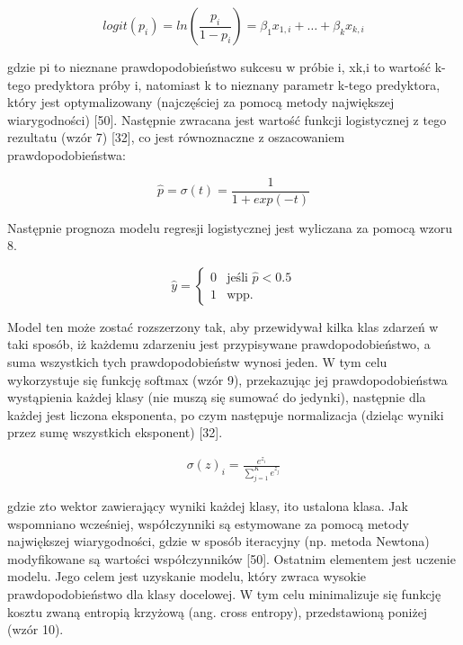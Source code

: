 \begin{equation}
logit(p_{i}) = ln( \frac {p_{i}} {1-p_{i}}) = \beta_{1}x_{1, i}+\dots+\beta_{k}x_{k, i}
\end{equation}

\noindent gdzie pi to nieznane prawdopodobieństwo sukcesu w próbie i, xk,i to wartość k-tego predyktora próby i, natomiast k to nieznany parametr k-tego predyktora, który jest optymalizowany (najczęściej za pomocą metody największej wiarygodności) [50]. Następnie zwracana jest wartość funkcji logistycznej z tego rezultatu (wzór 7) [32], co jest równoznaczne z oszacowaniem prawdopodobieństwa: 

\begin{equation}
\hat p = \sigma(t)=\frac {1} {1+exp(-t)}
\end{equation}

\noindent Następnie prognoza modelu regresji logistycznej jest wyliczana za pomocą wzoru 8.

\begin{equation}
\hat {y} =
    \begin{cases}
      0 & \text{jeśli $\hat {p} < 0.5$}\\
      1 & \text{wpp.}
 \end{cases}       
\end{equation}

\noindent Model ten może zostać rozszerzony tak, aby przewidywał kilka klas zdarzeń w taki sposób, iż każdemu zdarzeniu jest przypisywane prawdopodobieństwo, a suma wszystkich tych prawdopodobieństw wynosi jeden. W tym celu wykorzystuje się funkcję softmax (wzór 9), przekazując jej prawdopodobieństwa wystąpienia każdej klasy (nie muszą się sumować do jedynki), następnie dla każdej jest liczona eksponenta, po czym następuje normalizacja (dzieląc wyniki przez sumę wszystkich eksponent) [32].  

\begin{align*}
\sigma(z)_i=\frac {e^{z_i}} { 
    \sum_{j=1}^{K} e^{z_j}}
\end{align*}

\noindent gdzie zto wektor zawierający wyniki każdej klasy, ito ustalona klasa. Jak wspomniano wcześniej, współczynniki są estymowane za pomocą metody największej wiarygodności, gdzie w sposób iteracyjny (np. metoda Newtona) modyfikowane są wartości współczynników [50]. Ostatnim elementem jest uczenie modelu. Jego celem jest uzyskanie modelu, który zwraca wysokie prawdopodobieństwo dla klasy docelowej. W tym celu minimalizuje się funkcję kosztu zwaną entropią krzyżową (ang. cross entropy), przedstawioną poniżej (wzór 10). 

